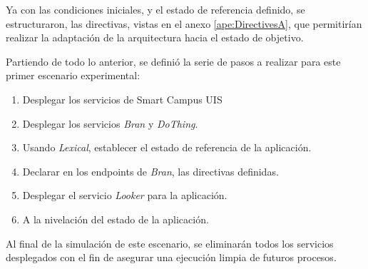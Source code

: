 Ya con las condiciones iniciales, y el estado de referencia definido, se estructuraron, las directivas, vistas en el anexo \ref{ape:DirectivesA}, que permitirían realizar la adaptación de la arquitectura hacia el estado de objetivo. 

Partiendo de todo lo anterior, se definió la serie de pasos a realizar para este primer escenario experimental:

\begin{enumerate}[itemsep=0mm]
    \item Desplegar los servicios de Smart Campus UIS
    \item Desplegar los servicios \textit{Bran} y \textit{DoThing}.
    \item Usando \textit{Lexical}, establecer el estado de referencia de la aplicación.
    \item Declarar en los endpoints de \textit{Bran}, las directivas definidas.
    \item Desplegar el servicio \textit{Looker} para la aplicación.
    \item A la nivelación del estado de la aplicación.
\end{enumerate}

Al final de la simulación de este escenario, se eliminarán todos los servicios desplegados con el fin de asegurar una ejecución limpia de futuros procesos.
